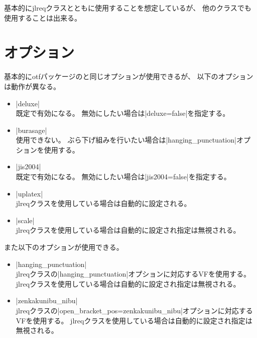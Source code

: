 \documentclass[dvipdfmx,a4paper]{jlreq}
\newcommand{\pkg}[1]{\textsf{#1}}
\newcommand{\cls}[1]{\textsf{#1}}
\begin{document}
基本的に\cls{jlreq}クラスとともに使用することを想定しているが、
他のクラスでも使用することは出来る。


\section{オプション}

基本的に\pkg{otf}パッケージのと同じオプションが使用できるが、
以下のオプションは動作が異なる。

\begin{itemize}
\item |deluxe|\\
  既定で有効になる。
  無効にしたい場合は|deluxe=false|を指定する。
\item |burasage|\\
  使用できない。
  ぶら下げ組みを行いたい場合は|hanging_punctuation|オプションを使用する。
\item |jis2004|\\
  既定で有効になる。
  無効にしたい場合は|jis2004=false|を指定する。
\item |uplatex|\\
  \cls{jlreq}クラスを使用している場合は自動的に設定される。
\item |scale|\\
  \cls{jlreq}クラスを使用している場合は自動的に設定され指定は無視される。
\end{itemize}

また以下のオプションが使用できる。

\begin{itemize}
\item |hanging_punctuation|\\
  \cls{jlreq}クラスの|hanging_punctuation|オプションに対応するVFを使用する。
  \cls{jlreq}クラスを使用している場合は自動的に設定され指定は無視される。
\item |zenkakunibu_nibu|\\
  \cls{jlreq}クラスの|open_bracket_pos=zenkakunibu_nibu|オプションに対応するVFを使用する。
  \cls{jlreq}クラスを使用している場合は自動的に設定され指定は無視される。
\end{itemize}
\end{document}
